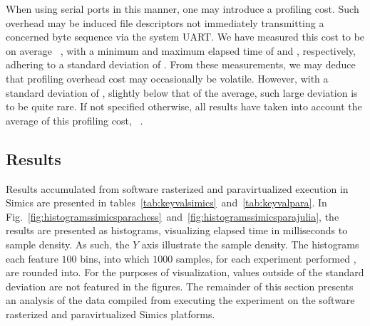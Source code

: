 When using serial ports in this manner, one may introduce a profiling cost.
Such overhead may be induced file descriptors not immediately transmitting a concerned byte sequence via the system UART.
We have measured this cost to be on average ~\milli\second , with a minimum and maximum elapsed time of  and , respectively, adhering to a standard deviation of .
From these measurements, we may deduce that profiling overhead cost may occasionally be volatile.
However, with a standard deviation of  \milli\second , slightly below that of the average, such large deviation is to be quite rare.
If not specified otherwise, all results have taken into account the average of this profiling cost, ~\milli\second .

\subsection{Results}
\label{sec:results}
Results accumulated from software rasterized and paravirtualized execution in Simics are presented in tables~\ref{tab:keyvalsimics}~and~\ref{tab:keyvalpara}.
In Fig.~\ref{fig:histogramssimicsparachess}~and~\ref{fig:histogramssimicsparajulia}, the results are presented as histograms, visualizing elapsed time in milliseconds to sample density.
As such, the $Y$ axis illustrate the sample density.
The histograms each feature $100$ bins, into which $1000$ samples, for each experiment performed , are rounded into.
For the purposes of visualization, values outside of the standard deviation are not featured in the figures.
The remainder of this section presents an analysis of the data compiled from executing the experiment on the software rasterized and paravirtualized Simics platforms.

\providecommand{\chesskeyone}{$60\times60$ tiles}
\providecommand{\chesskeytwo}{$84\times84$ tiles}
\providecommand{\chesskeythree}{$118\times118$ tiles}

\providecommand{\juliakeyone}{$225$ iterations}
\providecommand{\juliakeytwo}{$450$ iterations}
\providecommand{\juliakeythree}{$900$ iterations}

